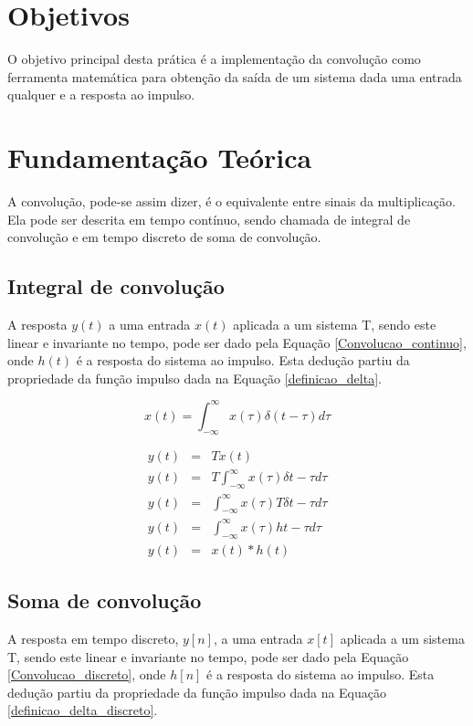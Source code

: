 \section{Objetivos}
 O objetivo principal desta prática é a implementação da convolução como ferramenta matemática para obtenção da saída de um sistema dada uma entrada qualquer e a resposta ao impulso.
 
\section{Fundamentação Teórica}
A convolução, pode-se assim dizer, é o equivalente entre sinais da multiplicação. Ela pode ser descrita em tempo contínuo, sendo chamada de integral de convolução e em tempo discreto de soma de convolução.

\subsection{Integral de convolução}
A resposta $y(t)$ a uma entrada $x(t)$ aplicada a um sistema T, sendo este linear e invariante no tempo, pode ser dado pela Equação \ref{Convolucao_continuo}, onde $h(t)$ é a resposta do sistema ao impulso. Esta dedução partiu da propriedade da função impulso dada na Equação \ref{definicao_delta}.

\begin{equation}
	x(t) = \int_{-\infty}^{\infty}x(\tau)\delta(t-\tau)d\tau
    \label{definicao_delta}
\end{equation}

\begin{eqnarray}
    y(t) &=& T{x(t)} \nonumber\\
    y(t) &=& T{\int_{-\infty}^{\infty} x(\tau)\delta {t-\tau}d\tau} \nonumber\\
    y(t) &=& \int_{-\infty}^{\infty} x(\tau)T{\delta {t-\tau}}d\tau \nonumber\\
    y(t) &=& \int_{-\infty}^{\infty} x(\tau)h{t-\tau}d\tau \nonumber\\
    y(t) &=& x(t)*h(t)
    \label{Convolucao_continuo}
\end{eqnarray}

\subsection{Soma de convolução}
A resposta em tempo discreto, $y[n]$, a uma entrada $x[t]$ aplicada a um sistema T, sendo este linear e invariante no tempo, pode ser dado pela Equação \ref{Convolucao_discreto}, onde $h[n]$ é a resposta do sistema ao impulso. Esta dedução partiu da propriedade da função impulso dada na Equação \ref{definicao_delta_discreto}.

